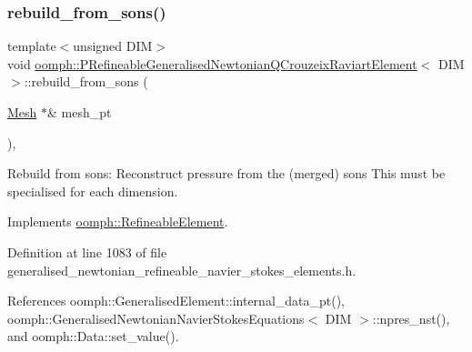 \subsubsection{\texorpdfstring{rebuild\+\_\+from\+\_\+sons()}{rebuild\_from\_sons()}}
{\footnotesize\ttfamily template$<$unsigned D\+IM$>$ \\
void \hyperlink{classoomph_1_1PRefineableGeneralisedNewtonianQCrouzeixRaviartElement}{oomph\+::\+P\+Refineable\+Generalised\+Newtonian\+Q\+Crouzeix\+Raviart\+Element}$<$ D\+IM $>$\+::rebuild\+\_\+from\+\_\+sons (\begin{DoxyParamCaption}\item[{\hyperlink{classoomph_1_1Mesh}{Mesh} $\ast$\&}]{mesh\+\_\+pt }\end{DoxyParamCaption})\hspace{0.3cm}{\ttfamily [inline]}, {\ttfamily [virtual]}}



Rebuild from sons\+: Reconstruct pressure from the (merged) sons This must be specialised for each dimension. 



Implements \hyperlink{classoomph_1_1RefineableElement_a33324be27833fa4b78279d17158215fa}{oomph\+::\+Refineable\+Element}.



Definition at line 1083 of file generalised\+\_\+newtonian\+\_\+refineable\+\_\+navier\+\_\+stokes\+\_\+elements.\+h.



References oomph\+::\+Generalised\+Element\+::internal\+\_\+data\+\_\+pt(), oomph\+::\+Generalised\+Newtonian\+Navier\+Stokes\+Equations$<$ D\+I\+M $>$\+::npres\+\_\+nst(), and oomph\+::\+Data\+::set\+\_\+value().

\mbox{\label{classoomph_1_1PRefineableGeneralisedNewtonianQCrouzeixRaviartElement_a84706eee87eeaf48a3fe4b30c413aacd}} 
